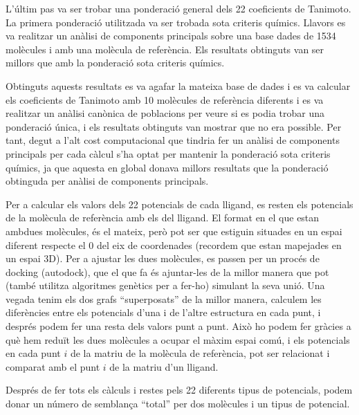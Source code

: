 L'últim pas va ser trobar una ponderació general dels 22 coeficients
de Tanimoto. La primera ponderació utilitzada va ser trobada sota
criteris químics. Llavors es va realitzar un anàlisi de components
principals sobre una base dades de 1534 molècules i amb una molècula
de referència. Els resultats obtinguts van ser millors que amb la
ponderació sota criteris químics.

Obtinguts aquests resultats es va agafar la mateixa base de dades i es
va calcular els coeficients de Tanimoto amb 10 molècules de referència
diferents i es va realitzar un anàlisi canònica de poblacions per
veure si es podia trobar una ponderació única, i els resultats
obtinguts van mostrar que no era possible. Per tant, degut a l'alt
cost computacional que tindria fer un anàlisi de components principals
per cada càlcul s'ha optat per mantenir la ponderació sota criteris
químics, ja que aquesta en global donava millors resultats que la
ponderació obtinguda per anàlisi de components principals.


Per a calcular els valors dels 22 potencials de cada lligand, es resten els
potencials de la molècula de referència amb els del lligand.  El format en el
que estan ambdues molècules, és el mateix, però pot ser que estiguin situades en
un espai diferent respecte el 0 del eix de coordenades (recordem que estan
mapejades en un espai 3D).  Per a ajustar les dues molècules, es passen per un
procés de docking (autodock), que el que fa és ajuntar-les de la millor manera que pot
(també utilitza algoritmes genètics per a fer-ho) simulant la seva unió. Una
vegada tenim els dos grafs ``superposats'' de la millor manera, calculem les
diferències entre els potencials d'una i de l'altre estructura en cada punt, i
després podem fer una resta dels valors punt a punt.  Això ho podem fer gràcies
a què hem reduït les dues molècules a ocupar el màxim espai comú, i els
potencials en cada punt $i$ de la matriu de la molècula de referència, pot ser
relacionat i comparat amb el punt $i$ de la matriu d'un lligand.

Després de fer tots els càlculs i restes pels 22 diferents tipus de potencials,
podem donar un número de semblança ``total'' per dos molècules i un tipus de
potencial.





